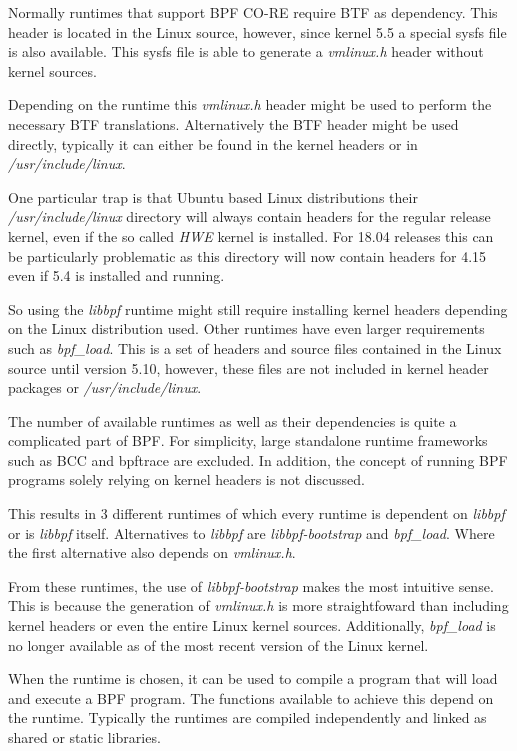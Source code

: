 \documentclass[conference]{IEEEtran}
\begin{document}
Normally runtimes that support BPF CO-RE require BTF as dependency. This header
is located in the Linux source, however, since kernel 5.5 a special sysfs file
is also available. This sysfs file is able to generate a \textit{vmlinux.h}
header without kernel sources.

Depending on the runtime this \textit{vmlinux.h} header might be used to
perform the necessary BTF translations. Alternatively the BTF header might be
used directly, typically it can either be found in the kernel headers or in
\textit{/usr/include/linux}.

One particular trap is that Ubuntu based Linux
distributions their \textit{/usr/include/linux} directory will always contain
headers for the regular release kernel, even if the so called \textit{HWE}
kernel is installed. For 18.04 releases this can be particularly problematic as
this directory will now contain headers for 4.15 even if 5.4 is installed and
running.

So using the \textit{libbpf} runtime might still require installing kernel
headers depending on the Linux distribution used. Other runtimes have even
larger requirements such as \textit{bpf\_load}. This is a set of headers and
source files contained in the Linux source until version 5.10, however, these
files are not included in kernel header packages or \textit{/usr/include/linux}.

The number of available runtimes as well as their dependencies is quite a
complicated part of BPF. For simplicity, large standalone runtime frameworks
such as BCC and bpftrace are excluded. In addition, the concept of running BPF
programs solely relying on kernel headers is not discussed.

This results in 3 different runtimes of which every runtime is dependent on
\textit{libbpf} or is \textit{libbpf} itself. Alternatives to \textit{libbpf}
are \textit{libbpf-bootstrap} and \textit{bpf\_load}. Where the first
alternative also depends on \textit{vmlinux.h}.

From these runtimes, the use of \textit{libbpf-bootstrap} makes the most
intuitive sense. This is because the generation of \textit{vmlinux.h} is more
straightfoward than including kernel headers or even the entire Linux kernel
sources. Additionally, \textit{bpf\_load} is no longer available as of the most
recent version of the Linux kernel.

When the runtime is chosen, it can be used to compile a program that will load
and execute a BPF program. The functions available to achieve this depend on
the runtime. Typically the runtimes are compiled independently and linked as
shared or static libraries.
\end{document}
